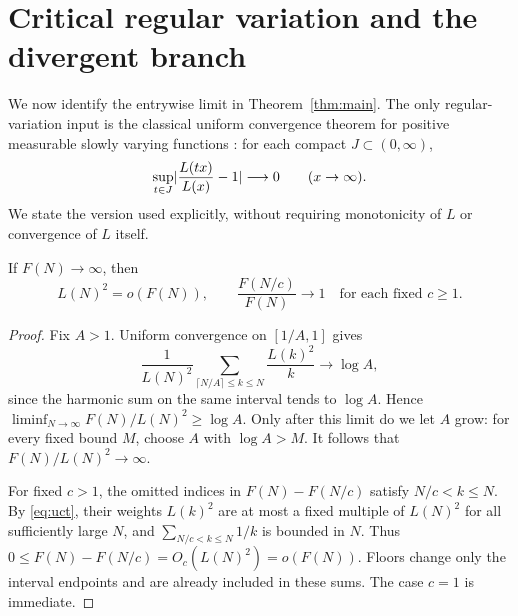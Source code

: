 \section{Critical regular variation and the divergent branch}
\label{sec:critical}

We now identify the entrywise limit in Theorem~\ref{thm:main}.
The only regular-variation input is the classical uniform convergence
theorem for positive measurable slowly varying functions
\citep{bingham1987regular}: for each compact $J\subset(0,\infty)$,
\begin{equation}
 \sup_{t\in J}\lvert \frac{L(tx)}{L(x)}-1\rvert\longrightarrow0
 \qquad(x\to\infty).
 \label{eq:uct}
\end{equation}
We state the version used explicitly, without requiring monotonicity of
$L$ or convergence of $L$ itself.

\begin{lemma}
\label{lem:critical-sums}
If $F(N)\to\infty$, then
\begin{equation}
 L(N)^2=o(F(N)),\qquad
 \frac{F(N/c)}{F(N)}\longrightarrow1
 \quad\text{for each fixed }c\ge1.
 \label{eq:critical-sums}
\end{equation}
\end{lemma}
\begin{proof}
Fix $A>1$. Uniform convergence on $[1/A,1]$ gives
\begin{equation}
 \frac{1}{L(N)^2}
 \sum_{\lceil N/A\rceil\le k\le N}\frac{L(k)^2}{k}
 \longrightarrow\log A,
 \label{eq:multiplicative-block}
\end{equation}
since the harmonic sum on the same interval tends to $\log A$.
Hence $\liminf_{N\to\infty}F(N)/L(N)^2\ge\log A$.
Only after this limit do we let $A$ grow: for every fixed bound $M$,
choose $A$ with $\log A>M$. It follows that $F(N)/L(N)^2\to\infty$.

For fixed $c>1$, the omitted indices in
$F(N)-F(N/c)$ satisfy $N/c<k\le N$.
By \eqref{eq:uct}, their weights $L(k)^2$ are at most a fixed
multiple of $L(N)^2$ for all sufficiently large $N$, and
$\sum_{N/c<k\le N}1/k$ is bounded in $N$.
Thus $0\le F(N)-F(N/c)=O_c(L(N)^2)=o(F(N))$.
Floors change only the interval endpoints and are already included
in these sums. The case $c=1$ is immediate.
\end{proof}

